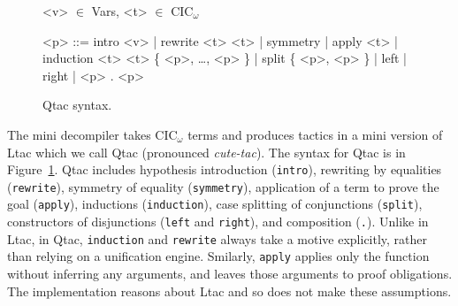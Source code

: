 \begin{figure}
\small
\begin{grammar}
<v> $\in$ Vars, <t> $\in$ CIC$_{\omega}$

<p> ::= intro <v> |  rewrite <t> <t> | symmetry | apply <t> | \\
induction <t> <t> \{ <p>, \ldots, <p> \} | split \{ <p>, <p> \} | left | right | <p> . <p>
\end{grammar}
\vspace{-0.2cm}
\caption{Qtac syntax.}
\label{fig:ltacsyntax1}
\end{figure}

The mini decompiler takes CIC$_{\omega}$ terms and produces tactics in a mini version of Ltac which we call 
Qtac (pronounced \textit{cute-tac}).
The syntax for Qtac is in Figure~\ref{fig:ltacsyntax1}.
Qtac includes hypothesis introduction (\lstinline{intro}),
rewriting by equalities (\lstinline{rewrite}), symmetry of equality (\lstinline{symmetry}),
application of a term to prove the goal (\lstinline{apply}), inductions (\lstinline{induction}),
case splitting of conjunctions (\lstinline{split}),
constructors of disjunctions (\lstinline{left} and \lstinline{right}), and
composition (\lstinline{.}).
Unlike in Ltac, in Qtac, \lstinline{induction} and \lstinline{rewrite} always take a motive explicitly, rather than relying on a unification engine.
Smilarly, \lstinline{apply} applies only the function without inferring any arguments, and leaves those arguments to proof obligations.
The implementation reasons about Ltac and so does not make these assumptions.

